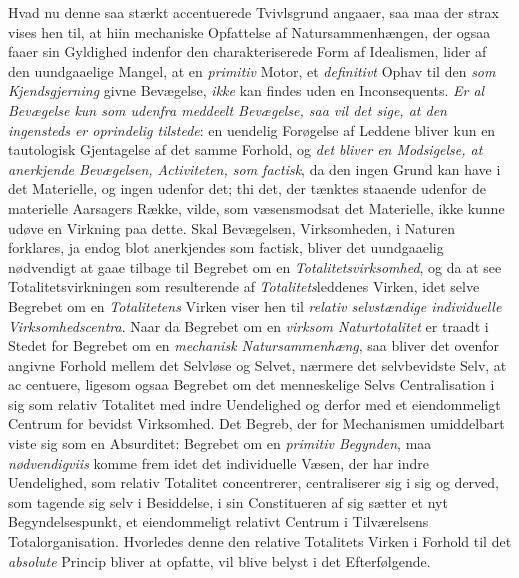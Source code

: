 Hvad nu denne saa stærkt accentuerede Tvivlsgrund angaaer, saa maa der strax
vises hen til, at hiin mechaniske Opfattelse af Natursammenhængen, der ogsaa
faaer sin Gyldighed indenfor den charakteriserede Form af Idealismen, lider af
den uundgaaelige Mangel, at en \emph{primitiv} Motor, et \emph{definitivt} Ophav
til den \emph{som Kjendsgjerning} givne Bevægelse, \emph{ikke} kan findes uden en
Inconsequents. \emph{Er al Bevægelse kun som udenfra meddeelt Bevægelse, saa vil
det sige, at den ingensteds er oprindelig tilstede}: en uendelig Forøgelse af
Leddene bliver kun en tautologisk Gjentagelse af det samme Forhold, og \emph{det
bliver en Modsigelse, at anerkjende Bevægelsen, Activiteten, som factisk}, da den
ingen Grund kan have i det Materielle, og ingen udenfor det; thi det, der tænktes
staaende udenfor de materielle Aarsagers Række, vilde, som væsensmodsat det
Materielle, ikke kunne udøve en Virkning paa dette. Skal Bevægelsen,
Virksomheden, i Naturen forklares, ja endog blot anerkjendes som factisk, bliver
det uundgaaelig nødvendigt at gaae tilbage til Begrebet om en
\emph{Totalitetsvirksomhed}, og da at see Totalitetsvirkningen som resulterende
af \emph{Totalitets}leddenes Virken, idet selve Begrebet om en
\emph{Totalitetens} Virken viser hen til \emph{relativ selvstændige individuelle
Virksomhedscentra}. Naar da Begrebet om en \emph{virksom Naturtotalitet} er
traadt i Stedet for Begrebet om en \emph{mechanisk Natursammenhæng}, saa bliver
det ovenfor angivne Forhold mellem det Selvløse og Selvet, nærmere det
selvbevidste Selv, at ac\-%
centuere, ligesom ogsaa Begrebet om det menneskelige Selvs Centralisation i sig
som relativ Totalitet med indre Uendelighed og derfor med et eiendommeligt
Centrum for bevidst Virksomhed. Det Begreb, der for Mechanismen umiddelbart viste
sig som en Absurditet: Begrebet om en \emph{primitiv Begynden}, maa
\emph{nødvendigviis} komme frem idet det individuelle Væsen, der har indre
Uendelighed, som relativ Totalitet concentrerer, centraliserer sig i sig og
derved, som tagende sig selv i Besiddelse, i sin Constitueren af sig sætter et
nyt Begyndelsespunkt, et eiendommeligt relativt Centrum i Tilværelsens
Totalorganisation. Hvorledes denne den relative Totalitets Virken i Forhold til
det \emph{absolute} Princip bliver at opfatte, vil blive belyst i det
Efterfølgende.

